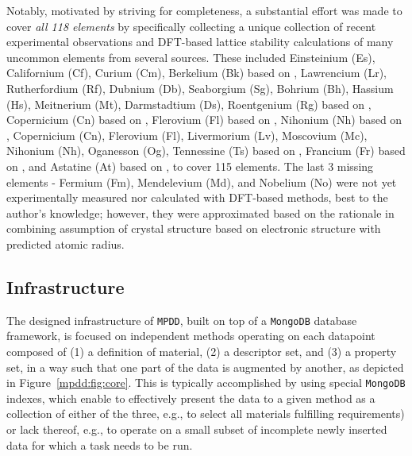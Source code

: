 Notably, motivated by striving for completeness, a substantial effort was made to cover \emph{all 118 elements} by specifically collecting a unique collection of recent experimental observations and DFT-based lattice stability calculations of many uncommon elements from several sources. These included Einsteinium (Es), Californium (Cf), Curium (Cm), Berkelium (Bk) based on \citet{2006TheElements}, Lawrencium (Lr), Rutherfordium (Rf), Dubnium (Db), Seaborgium (Sg), Bohrium (Bh), Hassium (Hs), Meitnerium (Mt), Darmstadtium (Ds), Roentgenium (Rg) based on \citet{Gyanchandani2011PhysicalMetals}, Copernicium (Cn) based on \citet{Atta-Fynn2015DensityElements}, Flerovium (Fl) based on \citet{MaizHadjAhmed2017RevisitingFlerovium}, Nihonium (Nh) based on \citet{Atarah2020FirstNihonium}, Copernicium (Cn), Flerovium (Fl), Livermorium (Lv), Moscovium (Mc), Nihonium (Nh), Oganesson (Og), Tennessine (Ts) based on \citet{Trombach2019ExploringTheory}, Francium (Fr) based on \citet{Koufos2013ElectronicFrancium}, and Astatine (At) based on \citet{Hermann2013CondensedMetallic}, to cover 115 elements. The last 3 missing elements -  Fermium (Fm), Mendelevium (Md), and Nobelium (No) were not yet experimentally measured nor calculated with DFT-based methods, best to the author's knowledge; however, they were approximated based on the rationale in \cite{2006TheElements} combining assumption of crystal structure based on electronic structure with predicted atomic radius.


\subsection{Infrastructure} \label{mpdd:ssec:infrastructure}

The designed infrastructure of \texttt{MPDD}, built on top of a \texttt{MongoDB} database framework, is focused on independent methods operating on each datapoint composed of (1) a definition of material, (2) a descriptor set, and (3) a property set, in a way such that one part of the data is augmented by another, as depicted in Figure~\ref{mpdd:fig:core}. This is typically accomplished by using special \texttt{MongoDB} indexes, which enable to effectively present the data to a given method as a collection of either of the three, e.g., to select all materials fulfilling requirements) or lack thereof, e.g., to operate on a small subset of incomplete newly inserted data for which a task needs to be run.

